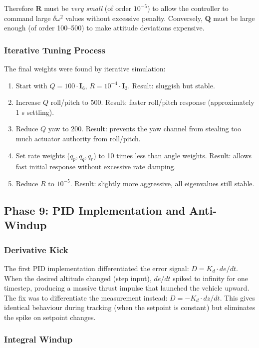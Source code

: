 \documentclass[12pt, a4paper]{article}
\newcommand{\bQ}{\bm{Q}}
\newcommand{\bR}{\bm{R}}
\newcommand{\bI}{\bm{I}}
\begin{document}
Therefore $\bR$ must be \emph{very small} (of order $10^{-5}$) to allow the controller to command large $\delta\omega^2$ values without excessive penalty.  Conversely, $\bQ$ must be large enough (of order 100--500) to make attitude deviations expensive.

\subsubsection{Iterative Tuning Process}

The final weights were found by iterative simulation:
\begin{enumerate}
    \item Start with $Q = 100 \cdot \bI_6$, $R = 10^{-4} \cdot \bI_3$.  Result: sluggish but stable.
    \item Increase $Q$ roll/pitch to 500.  Result: faster roll/pitch response (approximately 1 s settling).
    \item Reduce $Q$ yaw to 200.  Result: prevents the yaw channel from stealing too much actuator authority from roll/pitch.
    \item Set rate weights ($q_p, q_q, q_r$) to 10 times less than angle weights.  Result: allows fast initial response without excessive rate damping.
    \item Reduce $R$ to $10^{-5}$.  Result: slightly more aggressive, all eigenvalues still stable.
\end{enumerate}

\subsection{Phase 9: PID Implementation and Anti-Windup}

\subsubsection{Derivative Kick}

The first PID implementation differentiated the error signal: $D = K_d \cdot de/dt$.  When the desired altitude changed (step input), $de/dt$ spiked to infinity for one timestep, producing a massive thrust impulse that launched the vehicle upward.  The fix was to differentiate the measurement instead: $D = -K_d \cdot dz/dt$.  This gives identical behaviour during tracking (when the setpoint is constant) but eliminates the spike on setpoint changes.

\subsubsection{Integral Windup}
\end{document}
